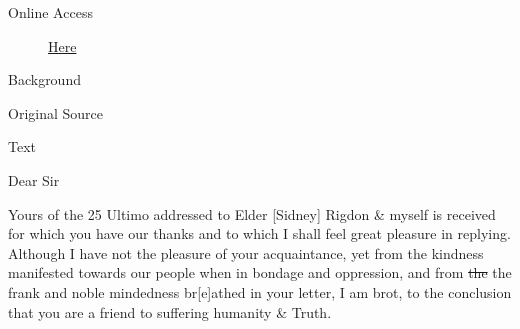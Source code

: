 			\begin{description}
				\item[Online Access] \href{https://www.josephsmithpapers.org/paper-summary/letter-to-john-c-bennett-8-august-1840/1}{Here}
			\end{description}
			
			\begin{description}
				\item[Background]
			\end{description}
			
			
			\begin{description}
				\item[Original Source]
			\end{description}
			
			
			\begin{description}
				\item[Text]
			\end{description}
			

				Dear Sir

				Yours of the 25 Ultimo addressed to Elder [Sidney] Rigdon \& myself is received for which you have our thanks and to which I shall feel great pleasure in replying. Although I have not the pleasure of your acquaintance, yet from the kindness manifested towards our people when in bondage and oppression, and from \sout{the} the frank and noble mindedness br[e]athed in your letter, I am brot, to the conclusion that you are a friend to suffering humanity \& Truth.

